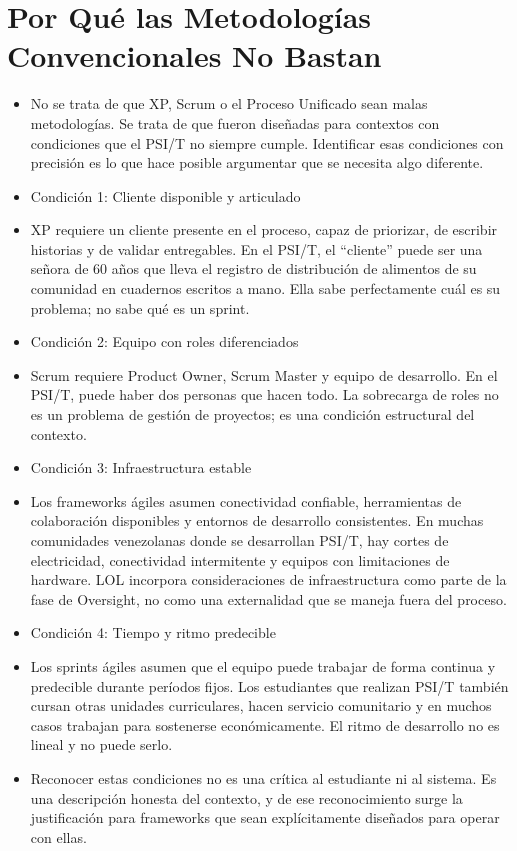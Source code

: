 \documentclass[14pt,a4paper,oneside]{extbook}
\begin{document}
\section{Por Qué las Metodologías Convencionales No Bastan}
\begin{itemize}
\item No se trata de que XP, Scrum o el Proceso Unificado sean malas metodologías. Se trata de que fueron diseñadas para contextos con condiciones que el PSI/T no siempre cumple. Identificar esas condiciones con precisión es lo que hace posible argumentar que se necesita algo diferente.
\item Condición 1: Cliente disponible y articulado
\item XP requiere un cliente presente en el proceso, capaz de priorizar, de escribir historias y de validar entregables. En el PSI/T, el \enquote{cliente} puede ser una señora de 60 años que lleva el registro de distribución de alimentos de su comunidad en cuadernos escritos a mano. Ella sabe perfectamente cuál es su problema; no sabe qué es un sprint.
\item Condición 2: Equipo con roles diferenciados
\item Scrum requiere Product Owner, Scrum Master y equipo de desarrollo. En el PSI/T, puede haber dos personas que hacen todo. La sobrecarga de roles no es un problema de gestión de proyectos; es una condición estructural del contexto.
\item Condición 3: Infraestructura estable
\item Los frameworks ágiles asumen conectividad confiable, herramientas de colaboración disponibles y entornos de desarrollo consistentes. En muchas comunidades venezolanas donde se desarrollan PSI/T, hay cortes de electricidad, conectividad intermitente y equipos con limitaciones de hardware. LOL incorpora consideraciones de infraestructura como parte de la fase de Oversight, no como una externalidad que se maneja fuera del proceso.
\item Condición 4: Tiempo y ritmo predecible
\item Los sprints ágiles asumen que el equipo puede trabajar de forma continua y predecible durante períodos fijos. Los estudiantes que realizan PSI/T también cursan otras unidades curriculares, hacen servicio comunitario y en muchos casos trabajan para sostenerse económicamente. El ritmo de desarrollo no es lineal y no puede serlo.
\item Reconocer estas condiciones no es una crítica al estudiante ni al sistema. Es una descripción honesta del contexto, y de ese reconocimiento surge la justificación para frameworks que sean explícitamente diseñados para operar con ellas.
\end{itemize}
\end{document}
